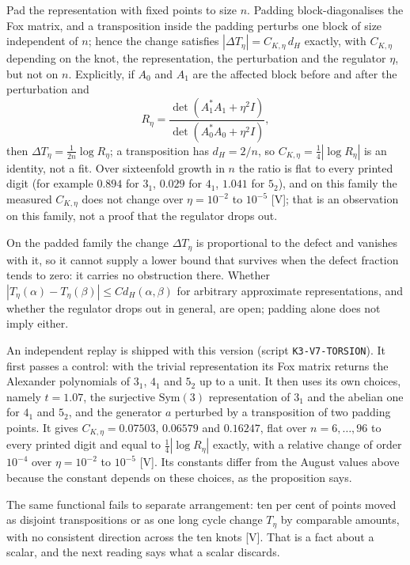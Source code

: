 \documentclass[11pt]{article}
\theoremstyle{remark}\newtheorem{remark}[theorem]{Remark}
\newcommand{\Sym}{\mathrm{Sym}}\newcommand{\dH}{d_H}\newcommand{\F}{\mathbb{F}}\newcommand{\Z}{\mathbb{Z}}
\begin{document}
\begin{proposition}[T+V]\label{prop:torsion}
Pad the representation with fixed points to size $n$. Padding block-diagonalises the Fox matrix, and a transposition inside the padding perturbs one block of size independent of $n$; hence the change satisfies $|\Delta T_\eta|=C_{K,\eta}\,\dH$ exactly, with $C_{K,\eta}$ depending on the knot, the representation, the perturbation and the regulator $\eta$, but not on $n$. Explicitly, if $A_0$ and $A_1$ are the affected block before and after the perturbation and
\[
R_\eta=\frac{\det(A_1^*A_1+\eta^2I)}{\det(A_0^*A_0+\eta^2I)},
\]
then $\Delta T_\eta=\frac1{2n}\log R_\eta$; a transposition has $\dH=2/n$, so $C_{K,\eta}=\tfrac14|\log R_\eta|$ is an identity, not a fit. Over sixteenfold growth in $n$ the ratio is flat to every printed digit (for example $0.894$ for $3_1$, $0.029$ for $4_1$, $1.041$ for $5_2$), and on this family the measured $C_{K,\eta}$ does not change over $\eta=10^{-2}$ to $10^{-5}$ [V]; that is an observation on this family, not a proof that the regulator drops out.
\end{proposition}
\begin{corollary}
On the padded family the change $\Delta T_\eta$ is proportional to the defect and vanishes with it, so it cannot supply a lower bound that survives when the defect fraction tends to zero: it carries no obstruction there. Whether $|T_\eta(\alpha)-T_\eta(\beta)|\le C\dH(\alpha,\beta)$ for arbitrary approximate representations, and whether the regulator drops out in general, are open; padding alone does not imply either.
\end{corollary}
An independent replay is shipped with this version (script \texttt{K3-V7-TORSION}). It first passes a control: with the trivial representation its Fox matrix returns the Alexander polynomials of $3_1$, $4_1$ and $5_2$ up to a unit. It then uses its own choices, namely $t=1.07$, the surjective $\Sym(3)$ representation of $3_1$ and the abelian one for $4_1$ and $5_2$, and the generator $a$ perturbed by a transposition of two padding points. It gives $C_{K,\eta}=0.07503$, $0.06579$ and $0.16247$, flat over $n=6,\dots,96$ to every printed digit and equal to $\tfrac14|\log R_\eta|$ exactly, with a relative change of order $10^{-4}$ over $\eta=10^{-2}$ to $10^{-5}$ [V]. Its constants differ from the August values above because the constant depends on these choices, as the proposition says.

The same functional fails to separate arrangement: ten per cent of points moved as disjoint transpositions or as one long cycle change $T_\eta$ by comparable amounts, with no consistent direction across the ten knots [V]. That is a fact about a scalar, and the next reading says what a scalar discards.
\end{document}
